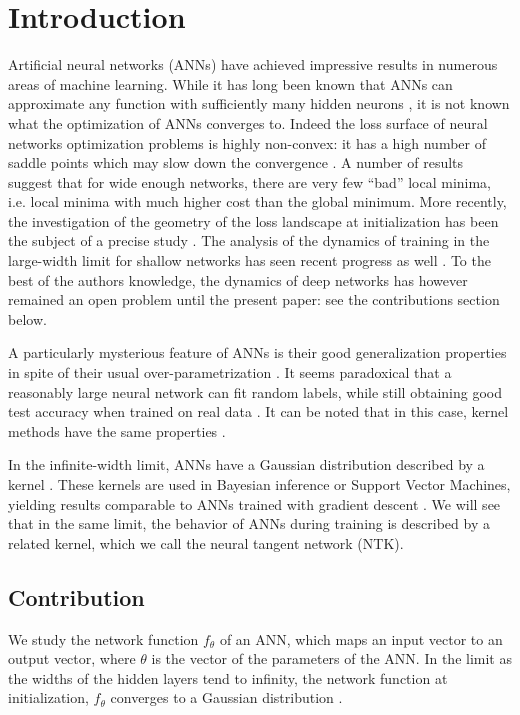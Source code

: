 \documentclass{article}
\begin{document}
\section{Introduction}
Artificial neural networks (ANNs) have achieved impressive results in numerous areas of machine learning. While it has long been known that ANNs can approximate any function with sufficiently many hidden neurons \cite{Hornik1989, Leshno}, it is not known what the optimization of ANNs converges to. Indeed the loss surface of neural networks optimization problems is highly non-convex: it has a high number of saddle points which may slow down the convergence \citep{Dauphin2014}. A number of results \citep{Choromanska, Pascanu2014, Pennington2017} suggest that for wide enough networks, there are very few ``bad'' local minima, i.e. local minima with much higher cost than the global minimum. More recently, the investigation of the geometry of the loss landscape at initialization has been the subject of a precise study \citep{Karakida2018}. The analysis of the dynamics of training in the large-width limit for shallow networks has seen recent progress as well \citep{Mei2018}. To the best of the authors knowledge, the dynamics of deep networks has however remained an open problem until the present paper: see the contributions section below.

A particularly mysterious feature of ANNs is their good generalization properties in spite of their usual over-parametrization \citep{Sagun}. It seems paradoxical that a reasonably large neural network can fit random labels, while still obtaining good test accuracy when trained on real data \citep{Zhang}. It can be noted that in this case, kernel methods have the same properties \citep{Belkin}.

In the infinite-width limit, ANNs have a Gaussian distribution described by a kernel \cite{Neal1996,Daniely, Matthews2017GaussianProcess,Lee2017,Matthews2018GaussianProcess}. These kernels are used in Bayesian inference or 
Support Vector Machines, yielding results comparable to ANNs trained with gradient descent \cite{Cho2009, Lee2017}. We will see that in the same limit, the behavior of ANNs during training is described by a related kernel, which we call the neural tangent network (NTK).

\subsection{Contribution}
We study the network function $f_\theta$ of an ANN, which maps an input vector to an output vector, where $\theta$ is the vector of the parameters of the ANN. In the limit as the widths of the hidden layers tend to infinity, the network function at initialization, $f_\theta$ converges to a Gaussian distribution \cite{Neal1996,Daniely, Matthews2017GaussianProcess,Lee2017,Matthews2018GaussianProcess}.
\end{document}
